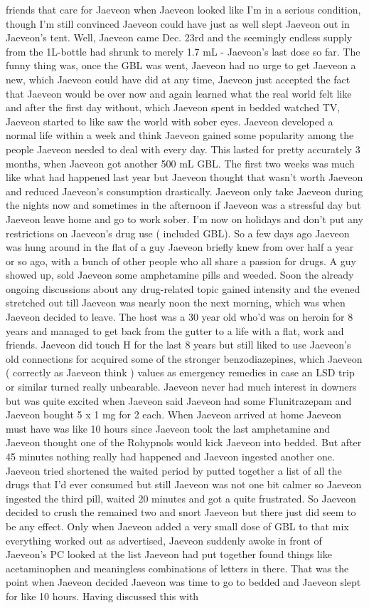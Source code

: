 \documentclass[12pt]{book}
\begin{document}
friends that care for Jaeveon when Jaeveon looked like I'm in a serious condition, though I'm still convinced Jaeveon could have just as well slept Jaeveon out in Jaeveon's tent. Well, Jaeveon came Dec. 23rd and the seemingly endless supply from the 1L-bottle had shrunk to merely 1.7 mL - Jaeveon's last dose so far. The funny thing was, once the GBL was went, Jaeveon had no urge to get Jaeveon a new, which Jaeveon could have did at any time, Jaeveon just accepted the fact that Jaeveon would be over now and again learned what the real world felt like and after the first day without, which Jaeveon spent in bedded watched TV, Jaeveon started to like saw the world with sober eyes. Jaeveon developed a normal life within a week and think Jaeveon gained some popularity among the people Jaeveon needed to deal with every day. This lasted for pretty accurately 3 months, when Jaeveon got another 500 mL GBL. The first two weeks was much like what had happened last year but Jaeveon thought that wasn't worth Jaeveon and reduced Jaeveon's consumption drastically. Jaeveon only take Jaeveon during the nights now and sometimes in the afternoon if Jaeveon was a stressful day but Jaeveon leave home and go to work sober. I'm now on holidays and don't put any restrictions on Jaeveon's drug use ( included GBL). So a few days ago Jaeveon was hung around in the flat of a guy Jaeveon briefly knew from over half a year or so ago, with a bunch of other people who all share a passion for drugs. A guy showed up, sold Jaeveon some amphetamine pills and weeded. Soon the already ongoing discussions about any drug-related topic gained intensity and the evened stretched out till Jaeveon was nearly noon the next morning, which was when Jaeveon decided to leave. The host was a 30 year old who'd was on heroin for 8 years and managed to get back from the gutter to a life with a flat, work and friends. Jaeveon did touch H for the last 8 years but still liked to use Jaeveon's old connections for acquired some of the stronger benzodiazepines, which Jaeveon ( correctly as Jaeveon think ) values as emergency remedies in case an LSD trip or similar turned really unbearable. Jaeveon never had much interest in downers but was quite excited when Jaeveon said Jaeveon had some Flunitrazepam and Jaeveon bought 5 x 1 mg for 2 each. When Jaeveon arrived at home Jaeveon must have was like 10 hours since Jaeveon took the last amphetamine and Jaeveon thought one of the Rohypnols would kick Jaeveon into bedded. But after 45 minutes nothing really had happened and Jaeveon ingested another one. Jaeveon tried shortened the waited period by putted together a list of all the drugs that I'd ever consumed but still Jaeveon was not one bit calmer so Jaeveon ingested the third pill, waited 20 minutes and got a quite frustrated. So Jaeveon decided to crush the remained two and snort Jaeveon but there just did seem to be any effect. Only when Jaeveon added a very small dose of GBL to that mix everything worked out as advertised, Jaeveon suddenly awoke in front of Jaeveon's PC looked at the list Jaeveon had put together found things like acetaminophen and meaningless combinations of letters in there. That was the point when Jaeveon decided Jaeveon was time to go to bedded and Jaeveon slept for like 10 hours. Having discussed this with 
\end{document}
